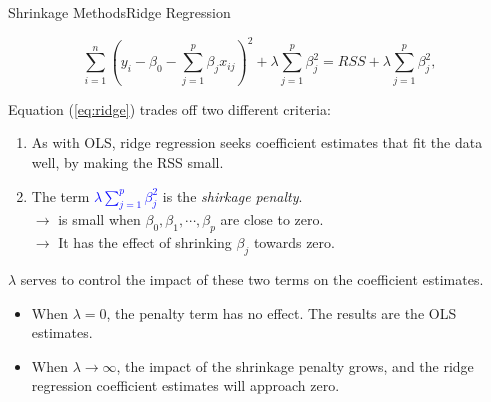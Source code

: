 \begin{frame}{Shrinkage Methods}{Ridge Regression}

        \begin{equation} \label{eq:ridge}
        \sum_{i=1}^n (y_i - \beta_0 - \sum_{j=1}^p  \beta_j x_{ij} )^2 + \lambda \sum_{j=1}^p \beta_j^2 = RSS + \lambda \sum_{j=1}^p \beta_j^2,
    \end{equation} \pause 

    Equation (\ref{eq:ridge}) trades oﬀ two diﬀerent criteria: \pause
    
    \begin{enumerate}
        \item As with OLS, ridge regression seeks coeﬃcient estimates that fit the data well, by making the RSS small. \pause 

        \item The term \textcolor{blue}{$ \lambda \sum_{j=1}^p \beta_j^2$} is the \textit{shirkage penalty}.  \\ \pause 
        $\rightarrow$ is small when $\beta_0 , \beta_1 , \cdots , \beta_p$ are close to zero. \pause \\ 
        $\rightarrow$ It has the eﬀect of shrinking $\beta_j$ towards zero. \pause     
    \end{enumerate}

    $\lambda$ serves to control the impact of these two terms on the coeﬃcient estimates. \pause 

    \begin{itemize}
        \item When $\lambda = 0$, the penalty term has no eﬀect. The results are the OLS estimates. \pause 
        \item When $\lambda \rightarrow \infty$, the impact of the shrinkage penalty grows, and the ridge regression coeﬃcient estimates will approach zero.
    \end{itemize}
    
\end{frame}

